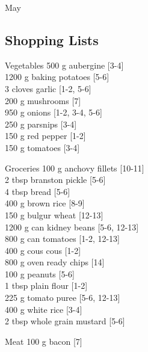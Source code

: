 \begin{menu}{May}
    \subsection*{Shopping Lists}
      \begin{shoppinglist}{Vegetables}
      500 g aubergine {\scriptsize[3-4]}\\
      1200 g baking potatoes {\scriptsize[5-6]}\\
      3 cloves garlic {\scriptsize[1-2, 5-6]}\\
      200 g mushrooms {\scriptsize[7]}\\
      950 g onions {\scriptsize[1-2, 3-4, 5-6]}\\
      250 g parsnips {\scriptsize[3-4]}\\
      150 g red pepper {\scriptsize[1-2]}\\
      150 g tomatoes {\scriptsize[3-4]}\\
      \end{shoppinglist}%
      \begin{shoppinglist}{Groceries}
      100 g anchovy fillets {\scriptsize[10-11]}\\
      2 tbsp branston pickle {\scriptsize[5-6]}\\
      4 tbsp bread {\scriptsize[5-6]}\\
      400 g brown rice {\scriptsize[8-9]}\\
      150 g bulgur wheat {\scriptsize[12-13]}\\
      1200 g can kidney beans {\scriptsize[5-6, 12-13]}\\
      800 g can tomatoes {\scriptsize[1-2, 12-13]}\\
      400 g cous cous {\scriptsize[1-2]}\\
      800 g oven ready chips {\scriptsize[14]}\\
      100 g peanuts {\scriptsize[5-6]}\\
      1 tbsp plain flour {\scriptsize[1-2]}\\
      225 g tomato puree {\scriptsize[5-6, 12-13]}\\
      400 g white rice {\scriptsize[3-4]}\\
      2 tbsp whole grain mustard {\scriptsize[5-6]}\\
      \end{shoppinglist}%
      \par\vfil %
      \begin{shoppinglist}{Meat}
      100 g bacon {\scriptsize[7]}\\

\end{shoppinglist}
\end{menu}
